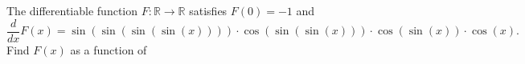 The differentiable function $F:\mathbb{R}\to\mathbb{R}$ satisfies $F(0)=-1$ and \[\dfrac{d}{dx}F(x)=\sin (\sin (\sin (\sin(x))))\cdot \cos( \sin (\sin (x))) \cdot \cos (\sin(x))\cdot\cos(x).\] Find $F(x)$ as a function of 